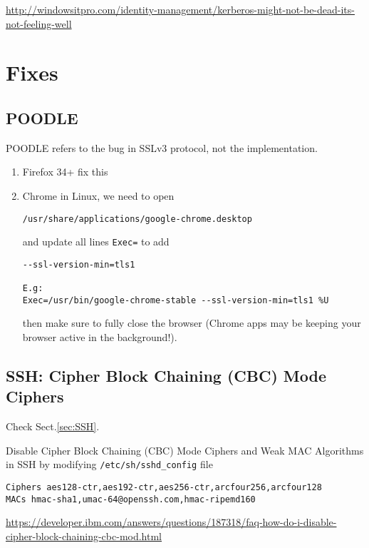 \url{http://windowsitpro.com/identity-management/kerberos-might-not-be-dead-its-not-feeling-well}


\section{Fixes}

\subsection{POODLE}

POODLE refers to the bug in SSLv3 protocol, not the implementation.

\begin{enumerate}
  \item Firefox 34+ fix this
  
  \item Chrome in Linux, we need to open
\begin{verbatim}
/usr/share/applications/google-chrome.desktop
\end{verbatim}
and update all lines \verb!Exec=! to add
\begin{verbatim}
--ssl-version-min=tls1

E.g:
Exec=/usr/bin/google-chrome-stable --ssl-version-min=tls1 %U
\end{verbatim}
then make
sure to fully close the browser (Chrome apps may be keeping your browser active
in the background!).

\end{enumerate}


\subsection{SSH: Cipher Block Chaining (CBC) Mode Ciphers }
\label{sec:SSH-patches}

Check Sect.\ref{sec:SSH}.

Disable Cipher Block Chaining (CBC) Mode Ciphers and Weak MAC Algorithms in SSH
by modifying \verb!/etc/sh/sshd_config! file

\begin{verbatim}
Ciphers aes128-ctr,aes192-ctr,aes256-ctr,arcfour256,arcfour128
MACs hmac-sha1,umac-64@openssh.com,hmac-ripemd160        
\end{verbatim}

\url{https://developer.ibm.com/answers/questions/187318/faq-how-do-i-disable-cipher-block-chaining-cbc-mod.html}


